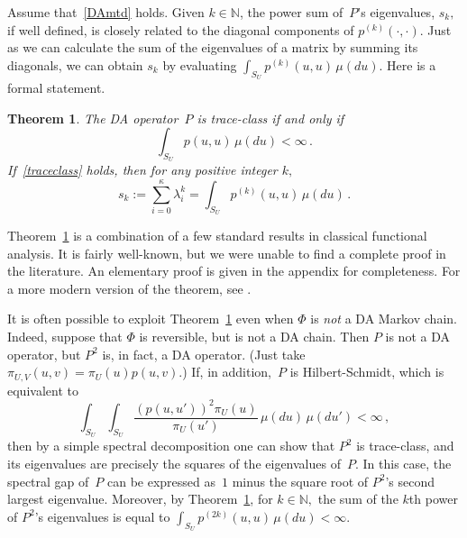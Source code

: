 \documentclass[11pt]{article}
\newtheorem{theorem}{Theorem}
\begin{document}
	Assume that~\eqref{DAmtd} holds. Given $k \in \mathbb{N}$, the power sum of~$P$'s eigenvalues,
        $s_k,$ if well defined, is closely related to the diagonal
        components of $p^{(k)}(\cdot,\cdot).$ Just as we can calculate
        the sum of the eigenvalues of a matrix by summing its
        diagonals, we can obtain $s_k$ by evaluating $\int_{S_U}
        p^{(k)}(u,u) \, \mu(du)$.  Here is a formal statement.
	
	\begin{theorem} \label{basic}
		The DA operator~$P$ is trace-class if and only if
		\begin{equation} \label{traceclass}
		\int_{S_U} p(u,u) \, \mu(du) < \infty \,.
		\end{equation}
		If~\eqref{traceclass} holds, then for any positive
                integer $k,$
		\begin{equation} \label{sum=int} s_k :=
                  \sum_{i=0}^{\kappa} \lambda_i^k = \int_{S_U}
                  p^{(k)}(u,u) \, \mu(du) \,.
		\end{equation}
	\end{theorem}

	Theorem~\ref{basic} is a combination of a few standard results
        in classical functional analysis.  It is fairly well-known,
        but we were unable to find a complete proof in the literature.
        An elementary proof is given in the appendix for
        completeness. For a more modern version of the theorem, see
        \cite{brislawn1988kernels}.

        It is often possible to exploit Theorem~\ref{basic} even when
        $\Phi$ is \textit{not} a DA Markov chain.  Indeed, suppose
        that $\Phi$ is reversible, but is not a DA chain.  Then $P$ is
        not a DA operator, but $P^2$ is, in fact, a DA operator.
        (Just take $\pi_{U,V}(u,v) = \pi_U(u)p(u,v)$.)  If, in
        addition,~$P$ is Hilbert-Schmidt, which is equivalent to
	\[
	\int_{S_U} \int_{S_U} \frac{(p(u,u'))^2 \pi_U(u)}{\pi_U(u')}
        \, \mu(du) \, \mu(du') < \infty \,,
        \]
        then by a simple spectral decomposition \citep[see e.g.][ \S 28
        Corollary 2.1]{helmberg2014introduction} one can show that
        $P^2$ is trace-class, and its eigenvalues are precisely the
        squares of the eigenvalues of~$P$.  In this case, the spectral
        gap of~$P$ can be expressed as~$1$ minus the square root of
        $P^2$'s second largest eigenvalue.  Moreover, by
        Theorem~\ref{basic}, for $k \in \mathbb{N},$ the sum of the
        $k$th power of $P^2$'s eigenvalues is equal to $\int_{S_U}
        p^{(2k)}(u,u) \, \mu(du) < \infty$.
\end{document}
